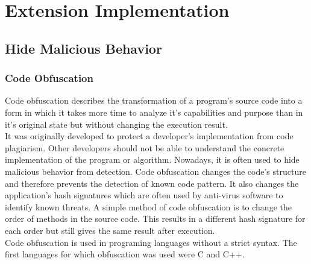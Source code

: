 
\section{Extension Implementation} %

	\subsection{Hide Malicious Behavior} %
	
		
	
		
		
		
		
		\subsubsection{Code Obfuscation}
			
			Code obfuscation describes the transformation of a program's source code into a form in which it takes more time to analyze it's capabilities and purpose than in it's original state but without changing the execution result.  \\
			
			It was originally developed to protect a developer's implementation from code plagiarism. Other developers should not be able to understand the concrete implementation of the program or algorithm. Nowadays, it is often used to hide malicious behavior from detection. Code obfuscation changes the code's structure and therefore prevents the detection of known code pattern. It also changes the application's hash signatures which are often used by anti-virus software to identify known threats. A simple method of code obfuscation is to change the order of methods in the source code. This results in a different hash signature for each order but still gives the same result after execution. \\
			
			Code obfuscation is used in programing languages without a strict syntax. The first languages for which obfuscation was used were C and C++. \\
			
		
